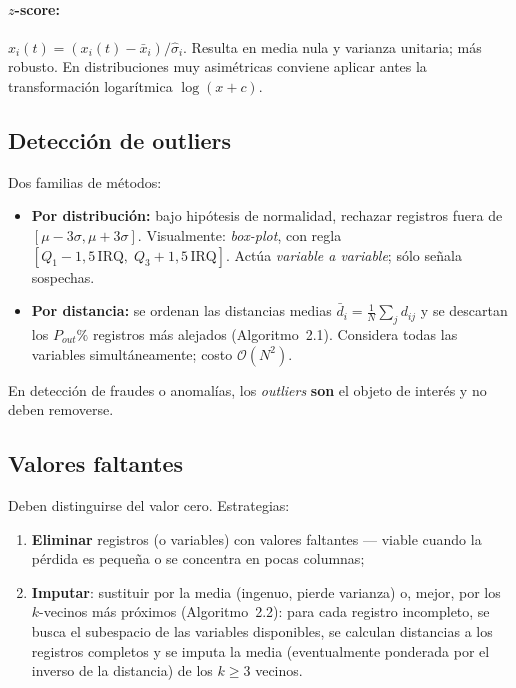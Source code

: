 \paragraph{$z$-score:} $\hat{x}_i(t)=(x_i(t)-\bar{x}_i)/\hat{\sigma}_i$.
Resulta en media nula y varianza unitaria; más robusto. En
distribuciones muy asimétricas conviene aplicar antes la transformación
logarítmica $\log(x+c)$.

\subsection{Detección de outliers}

Dos familias de métodos:
\begin{itemize}[leftmargin=1.2cm]
  \item \textbf{Por distribución:} bajo hipótesis de normalidad,
        rechazar registros fuera de $[\mu-3\sigma,\mu+3\sigma]$.
        Visualmente: \emph{box-plot}, con regla
        $[Q_1-1{,}5\,\mathrm{IRQ},\;Q_3+1{,}5\,\mathrm{IRQ}]$. Actúa
        \emph{variable a variable}; sólo señala sospechas.
  \item \textbf{Por distancia:} se ordenan las distancias medias
        $\bar{d}_i=\frac{1}{N}\sum_j d_{ij}$ y se descartan los
        $P_{out}\%$ registros más alejados (Algoritmo~2.1). Considera
        todas las variables simultáneamente; costo $\mathcal{O}(N^2)$.
\end{itemize}

\begin{aplicacao}
En detección de fraudes o anomalías, los \emph{outliers} \textbf{son}
el objeto de interés y no deben removerse.
\end{aplicacao}

\subsection{Valores faltantes}

Deben distinguirse del valor cero. Estrategias:
\begin{enumerate}[leftmargin=1.2cm]
  \item \textbf{Eliminar} registros (o variables) con valores
        faltantes — viable cuando la pérdida es pequeña o se concentra
        en pocas columnas;
  \item \textbf{Imputar}: sustituir por la media (ingenuo, pierde
        varianza) o, mejor, por los $k$-vecinos más próximos
        (Algoritmo~2.2): para cada registro incompleto, se busca el
        subespacio de las variables disponibles, se calculan distancias
        a los registros completos y se imputa la media (eventualmente
        ponderada por el inverso de la distancia) de los $k\geq 3$
        vecinos.
\end{enumerate}

